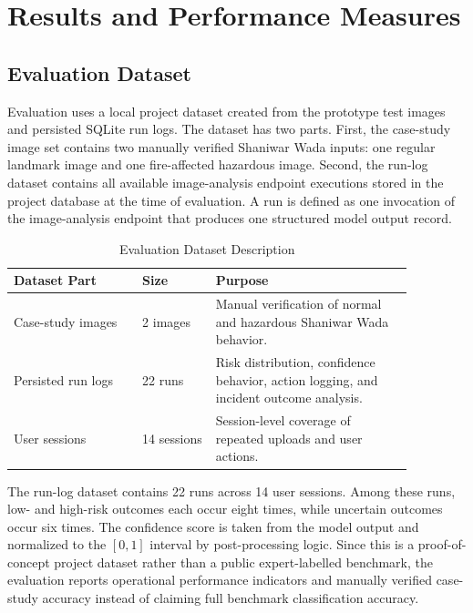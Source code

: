 \documentclass[10pt,conference]{IEEEtran}
\begin{document}
\section{Results and Performance Measures}

\subsection{Evaluation Dataset}
Evaluation uses a local project dataset created from the prototype test images and persisted SQLite run logs. The dataset has two parts. First, the case-study image set contains two manually verified Shaniwar Wada inputs: one regular landmark image and one fire-affected hazardous image. Second, the run-log dataset contains all available image-analysis endpoint executions stored in the project database at the time of evaluation. A run is defined as one invocation of the image-analysis endpoint that produces one structured model output record.

\begin{table}[h]
\caption{Evaluation Dataset Description}
\centering
\begin{tabular}{p{0.28\linewidth}p{0.16\linewidth}p{0.43\linewidth}}
\toprule
\textbf{Dataset Part} & \textbf{Size} & \textbf{Purpose} \\
\midrule
Case-study images & 2 images & Manual verification of normal and hazardous Shaniwar Wada behavior. \\
Persisted run logs & 22 runs & Risk distribution, confidence behavior, action logging, and incident outcome analysis. \\
User sessions & 14 sessions & Session-level coverage of repeated uploads and user actions. \\
\bottomrule
\end{tabular}
\end{table}

The run-log dataset contains 22 runs across 14 user sessions. Among these runs, low- and high-risk outcomes each occur eight times, while uncertain outcomes occur six times. The confidence score is taken from the model output and normalized to the $[0,1]$ interval by post-processing logic. Since this is a proof-of-concept project dataset rather than a public expert-labelled benchmark, the evaluation reports operational performance indicators and manually verified case-study accuracy instead of claiming full benchmark classification accuracy.
\end{document}
